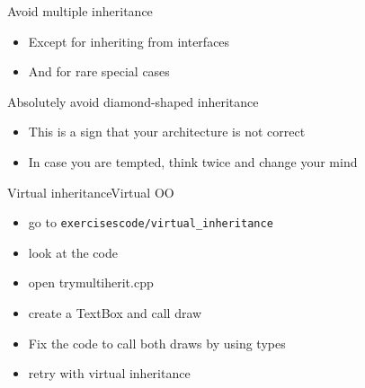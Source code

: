 \begin{frame}[fragile]
  \begin{goodpractice}{Avoid multiple inheritance}
    \begin{itemize}
    \item Except for inheriting from interfaces
    \item And for rare special cases
    \end{itemize}
  \end{goodpractice}
  \pause
  \begin{goodpractice}{Absolutely avoid diamond-shaped inheritance}
    \begin{itemize}
    \item This is a sign that your architecture is not correct
    \item In case you are tempted, think twice and change your mind
    \end{itemize}
  \end{goodpractice}
\end{frame}

\begin{frame}[fragile]
  \begin{exerciseWithShortcut}{Virtual inheritance}{Virtual OO}
    \begin{itemize}
    \item go to \texttt{exercisescode/virtual\_inheritance}
    \item look at the code
    \item open trymultiherit.cpp
    \item create a TextBox and call draw
    \item Fix the code to call both draws by using types
    \item retry with virtual inheritance
    \end{itemize}
  \end{exerciseWithShortcut}
\end{frame}
